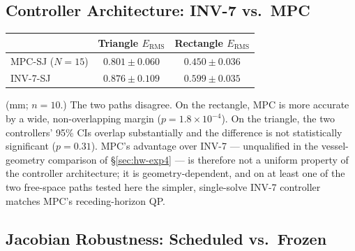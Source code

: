 \documentclass[journal]{IEEEtran}
\begin{document}
\subsection{Controller Architecture: INV-7 vs.\ MPC}
\label{sec:shape-exp2}

\begin{center}
\begin{tabular}{@{}lcc@{}}
\toprule
& Triangle $E_{\mathrm{RMS}}$ & Rectangle $E_{\mathrm{RMS}}$ \\
\midrule
MPC-SJ ($N{=}15$) & $0.801\pm0.060$ & $0.450\pm0.036$ \\
INV-7-SJ & $0.876\pm0.109$ & $0.599\pm0.035$ \\
\bottomrule
\end{tabular}
\end{center}
(mm; $n=10$.) The two paths disagree. On the rectangle, MPC is more
accurate by a wide, non-overlapping margin ($p=1.8\times10^{-4}$). On
the triangle, the two controllers' 95\% CIs overlap substantially and
the difference is not statistically significant
($p=0.31$). MPC's advantage over INV-7 --- unqualified in the
vessel-geometry comparison of \S\ref{sec:hw-exp4} --- is therefore not a
uniform property of the controller architecture; it is geometry-dependent,
and on at least one of the two free-space paths tested here the simpler,
single-solve INV-7 controller matches MPC's receding-horizon QP.

\subsection{Jacobian Robustness: Scheduled vs.\ Frozen}
\label{sec:shape-exp3}
\end{document}
